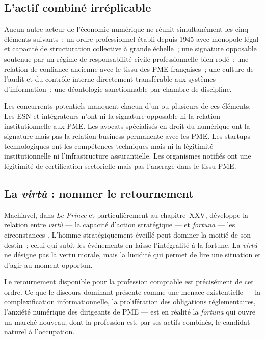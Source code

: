 \documentclass[12pt,a4paper]{article}
\begin{document}
\subsection{L'actif combiné irréplicable}

Aucun autre acteur de l'économie numérique ne réunit simultanément les cinq éléments suivants~: un ordre professionnel établi depuis 1945 avec monopole légal et capacité de structuration collective à grande échelle~; une signature opposable soutenue par un régime de responsabilité civile professionnelle bien rodé~; une relation de confiance ancienne avec le tissu des PME françaises~; une culture de l'audit et du contrôle interne directement transférable aux systèmes d'information~; une déontologie sanctionnable par chambre de discipline.

Les concurrents potentiels manquent chacun d'un ou plusieurs de ces éléments. Les ESN et intégrateurs n'ont ni la signature opposable ni la relation institutionnelle aux PME. Les avocats spécialisés en droit du numérique ont la signature mais pas la relation business permanente avec les PME. Les startups technologiques ont les compétences techniques mais ni la légitimité institutionnelle ni l'infrastructure assurantielle. Les organismes notifiés ont une légitimité de certification sectorielle mais pas l'ancrage dans le tissu PME.

\subsection{La \emph{virtù} : nommer le retournement}

Machiavel, dans \emph{Le Prince} et particulièrement au chapitre~XXV, développe la relation entre \emph{virtù} --- la capacité d'action stratégique --- et \emph{fortuna} --- les circonstances \parencite{machiavel1532}. L'homme stratégiquement éveillé peut dominer la moitié de son destin~; celui qui subit les événements en laisse l'intégralité à la fortune. La \emph{virtù} ne désigne pas la vertu morale, mais la lucidité qui permet de lire une situation et d'agir au moment opportun.

Le retournement disponible pour la profession comptable est précisément de cet ordre. Ce que le discours dominant présente comme une menace existentielle --- la complexification informationnelle, la prolifération des obligations réglementaires, l'anxiété numérique des dirigeants de PME --- est en réalité la \emph{fortuna} qui ouvre un marché nouveau, dont la profession est, par ses actifs combinés, le candidat naturel à l'occupation.
\end{document}

